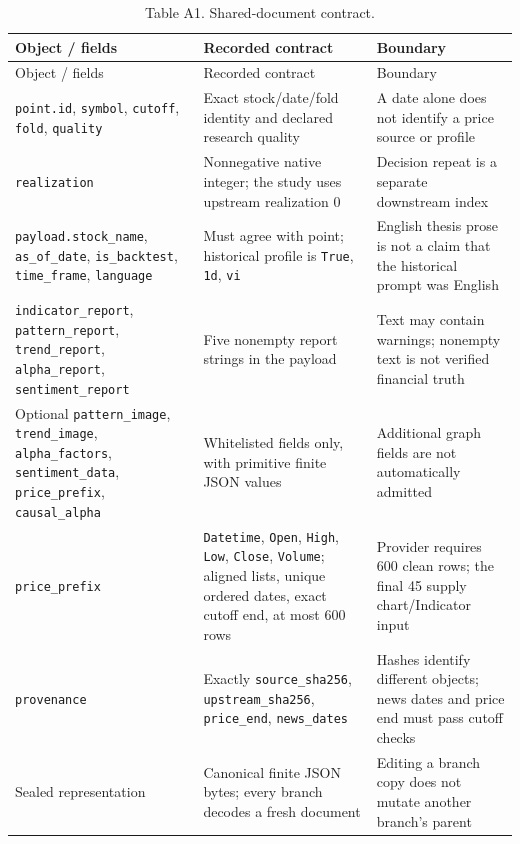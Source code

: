 \begin{longtable}[]{@{}
  >{\raggedright\arraybackslash}p{}
  >{\raggedright\arraybackslash}p{}
  >{\raggedright\arraybackslash}p{}@{}}
\caption{Table A1. Shared-document contract.}\label{tab:A_contracts:1}\tabularnewline
\toprule\noalign{}
Object / fields
 & Recorded contract
 & Boundary
 \\
\midrule\noalign{}
\endfirsthead
\toprule\noalign{}
Object / fields
 & Recorded contract
 & Boundary
 \\
\midrule\noalign{}
\endhead
\bottomrule\noalign{}
\endlastfoot
\texttt{point.\allowbreak{}id}, \texttt{symbol}, \texttt{cutoff}, \texttt{fold}, \texttt{quality} & Exact stock/date/fold identity and declared research quality & A date alone does not identify a price source or profile \\
\texttt{realization} & Nonnegative native integer; the study uses upstream realization 0 & Decision repeat is a separate downstream index \\
\texttt{payload.\allowbreak{}stock\_\allowbreak{}name}, \texttt{as\_\allowbreak{}of\_\allowbreak{}date}, \texttt{is\_\allowbreak{}backtest}, \texttt{time\_\allowbreak{}frame}, \texttt{language} & Must agree with point; historical profile is \texttt{True}, \texttt{1d}, \texttt{vi} & English thesis prose is not a claim that the historical prompt was English \\
\texttt{indicator\_\allowbreak{}report}, \texttt{pattern\_\allowbreak{}report}, \texttt{trend\_\allowbreak{}report}, \texttt{alpha\_\allowbreak{}report}, \texttt{sentiment\_\allowbreak{}report} & Five nonempty report strings in the payload & Text may contain warnings; nonempty text is not verified financial truth \\
Optional \texttt{pattern\_\allowbreak{}image}, \texttt{trend\_\allowbreak{}image}, \texttt{alpha\_\allowbreak{}factors}, \texttt{sentiment\_\allowbreak{}data}, \texttt{price\_\allowbreak{}prefix}, \texttt{causal\_\allowbreak{}alpha} & Whitelisted fields only, with primitive finite JSON values & Additional graph fields are not automatically admitted \\
\texttt{price\_\allowbreak{}prefix} & \texttt{Datetime}, \texttt{Open}, \texttt{High}, \texttt{Low}, \texttt{Close}, \texttt{Volume}; aligned lists, unique ordered dates, exact cutoff end, at most 600 rows & Provider requires 600 clean rows; the final 45 supply chart/Indicator input \\
\texttt{provenance} & Exactly \texttt{source\_\allowbreak{}sha256}, \texttt{upstream\_\allowbreak{}sha256}, \texttt{price\_\allowbreak{}end}, \texttt{news\_\allowbreak{}dates} & Hashes identify different objects; news dates and price end must pass cutoff checks \\
Sealed representation & Canonical finite JSON bytes; every branch decodes a fresh document & Editing a branch copy does not mutate another branch's parent \\
\end{longtable}

